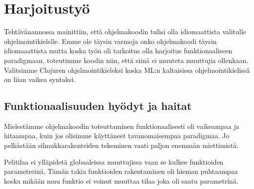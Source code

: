\documentclass[12pt]{article}
\begin{document}
\newpage
\section{Harjoitustyö}
Tehtävänannossa mainittiin, että ohjelmakoodin tulisi olla idiomaattista valitulle ohjelmointikielelle.
Emme ole täysin varmoja onko ohjelmakoodi täysin idiomaaattista mutta koska työn oli tarkoitus olla harjoitus funktionaaliseen paradigmaan,
toteutimme koodin niin, että siinä ei muuteta muuttujia ollenkaan.
Valitsimme Clojuren ohjelmointikieleksi koska ML:n kaltaisissa ohjelmointikielissä on liian vaikea syntaksi.

\subsection{Funktionaalisuuden hyödyt ja haitat}
Mielestämme ohjelmakoodin toteuttaminen funktionaalisesti oli vaikeampaa ja hitaampaa, kuin jos olisimme käyttäneet tavanomaisempaa
paradigmaa. Jo pelkästään silmukkarakenteiden tekeminen vaati paljon enemmän miettimistä. 


Pelitilaa ei ylläpidetä globaaleissa muuttujissa vaan se kulkee funktioiden parametreinä.
Tämän takia funktioiden rakentaminen oli hieman puhtaampaa koska mikään muu funktio ei voinut muuttaa tilaa joka oli saatu parametrinä.






\end{document}
